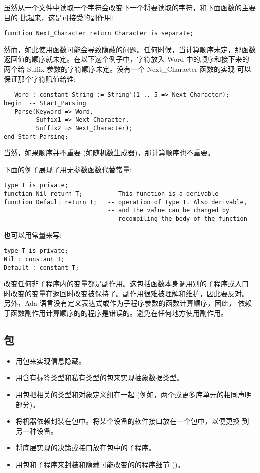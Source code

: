 \begin{blockindent}
虽然从一个文件中读取一个字符会改变下一个将要读取的字符，和下面函数的主要目的
比起来，这是可接受的副作用:
\begin{lstlisting}
function Next_Character return Character is separate;
\end{lstlisting}
然而，如此使用函数可能会导致隐蔽的问题。任何时候，当计算顺序未定，那函数
返回值的顺序就未定。在以下这个例子中，字符放入 Word 中的顺序和接下来的
两个给 Suffix 参数的字符顺序未定。没有一个 Next\_Character 函数的实现
可以保证那个字符赋值给谁:
\begin{lstlisting}
   Word : constant String := String'(1 .. 5 => Next_Character);
begin  -- Start_Parsing
   Parse(Keyword => Word,
         Suffix1 => Next_Character,
         Suffix2 => Next_Character);
end Start_Parsing;
\end{lstlisting}

当然，如果顺序并不重要 (如随机数生成器)，那计算顺序也不重要。

下面的例子展现了用无参数函数代替常量:
\begin{lstlisting}
type T is private;
function Nil return T;       -- This function is a derivable 
function Default return T;   -- operation of type T. Also derivable, 
                             -- and the value can be changed by
                             -- recompiling the body of the function
\end{lstlisting}
也可以用常量来写:
\begin{lstlisting}
type T is private;
Nil : constant T;
Default : constant T;
\end{lstlisting}
\end{blockindent}

\begin{blockindent}
改变任何非子程序内的变量都是副作用。这包括函数本身调用别的子程序或入口
时改变的变量在返回时改变被保持了。副作用很难被理解和维护，因此要反对。
另外，Ada 语言没有定义表达式或作为子程序参数的函数计算顺序，因此，
依赖于函数副作用计算顺序的的程序是错误的。避免在任何地方使用副作用。
\end{blockindent}

\subsection{包}
\begin{itemize}
\item 用包来实现信息隐藏。
\item 用含有标签类型和私有类型的包来实现抽象数据类型。
\item 用包把相关的类型和对象定义组在一起
      (例如，两个或更多库单元的相同声明部分)。
\item 将机器依赖封装在包中。将某个设备的软件接口放在一个包中，以便更换
到另一种设备。
\item 将底层实现的决策或接口放在包中的子程序。
\item 用包和子程序来封装和隐藏可能改变的的程序细节 (\cite{nissen84})。
\end{itemize}

